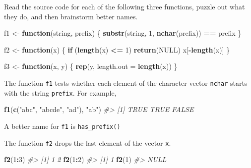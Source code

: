 \documentclass[]{book}
\newenvironment{Shaded}{\begin{snugshade}}{\end{snugshade}}
\newcommand{\CommentTok}[1]{\textcolor[rgb]{0.56,0.35,0.01}{\textit{#1}}}
\newcommand{\ControlFlowTok}[1]{\textcolor[rgb]{0.13,0.29,0.53}{\textbf{#1}}}
\newcommand{\DataTypeTok}[1]{\textcolor[rgb]{0.13,0.29,0.53}{#1}}
\newcommand{\DecValTok}[1]{\textcolor[rgb]{0.00,0.00,0.81}{#1}}
\newcommand{\KeywordTok}[1]{\textcolor[rgb]{0.13,0.29,0.53}{\textbf{#1}}}
\newcommand{\NormalTok}[1]{#1}
\newcommand{\OperatorTok}[1]{\textcolor[rgb]{0.81,0.36,0.00}{\textbf{#1}}}
\newcommand{\OtherTok}[1]{\textcolor[rgb]{0.56,0.35,0.01}{#1}}
\newcommand{\StringTok}[1]{\textcolor[rgb]{0.31,0.60,0.02}{#1}}
\theoremstyle{plain}
\theoremstyle{remark}
\begin{document}
Read the source code for each of the following three functions, puzzle out what they do, and then brainstorm better names.

\begin{Shaded}
\begin{Highlighting}[]
\NormalTok{f1 <-}\StringTok{ }\ControlFlowTok{function}\NormalTok{(string, prefix) \{}
  \KeywordTok{substr}\NormalTok{(string, }\DecValTok{1}\NormalTok{, }\KeywordTok{nchar}\NormalTok{(prefix)) }\OperatorTok{==}\StringTok{ }\NormalTok{prefix}
\NormalTok{\}}

\NormalTok{f2 <-}\StringTok{ }\ControlFlowTok{function}\NormalTok{(x) \{}
  \ControlFlowTok{if}\NormalTok{ (}\KeywordTok{length}\NormalTok{(x) }\OperatorTok{<=}\StringTok{ }\DecValTok{1}\NormalTok{) }\KeywordTok{return}\NormalTok{(}\OtherTok{NULL}\NormalTok{)}
\NormalTok{  x[}\OperatorTok{-}\KeywordTok{length}\NormalTok{(x)]}
\NormalTok{\}}

\NormalTok{f3 <-}\StringTok{ }\ControlFlowTok{function}\NormalTok{(x, y) \{}
  \KeywordTok{rep}\NormalTok{(y, }\DataTypeTok{length.out =} \KeywordTok{length}\NormalTok{(x))}
\NormalTok{\}}
\end{Highlighting}
\end{Shaded}

The function \texttt{f1} tests whether each element of the character vector \texttt{nchar}
starts with the string \texttt{prefix}. For example,

\begin{Shaded}
\begin{Highlighting}[]
\KeywordTok{f1}\NormalTok{(}\KeywordTok{c}\NormalTok{(}\StringTok{"abc"}\NormalTok{, }\StringTok{"abcde"}\NormalTok{, }\StringTok{"ad"}\NormalTok{), }\StringTok{"ab"}\NormalTok{)}
\CommentTok{#> [1]  TRUE  TRUE FALSE}
\end{Highlighting}
\end{Shaded}

A better name for \texttt{f1} is \texttt{has\_prefix()}

The function \texttt{f2} drops the last element of the vector \texttt{x}.

\begin{Shaded}
\begin{Highlighting}[]
\KeywordTok{f2}\NormalTok{(}\DecValTok{1}\OperatorTok{:}\DecValTok{3}\NormalTok{)}
\CommentTok{#> [1] 1 2}
\KeywordTok{f2}\NormalTok{(}\DecValTok{1}\OperatorTok{:}\DecValTok{2}\NormalTok{)}
\CommentTok{#> [1] 1}
\KeywordTok{f2}\NormalTok{(}\DecValTok{1}\NormalTok{)}
\CommentTok{#> NULL}
\end{Highlighting}
\end{Shaded}
\end{document}
